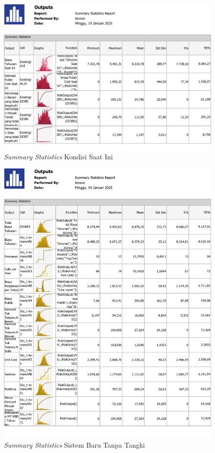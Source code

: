 \begin{figure}
    \centering
    \includegraphics[width=\textwidth]{lampiran/summary-now.jpg}
    \caption*{\emph{Summary Statistics} Kondisi Saat Ini}
\end{figure}

\begin{figure}[!ht]
    \centering
    \includegraphics[width=\linewidth,height=\textheight,keepaspectratio]{lampiran/summary-no-tangki.jpg}
    \caption*{\emph{Summary Statistics} Sistem Baru Tanpa Tangki}
\end{figure}

